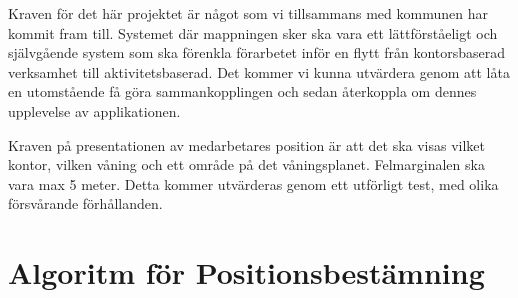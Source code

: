 \documentclass[swedish, a4paper,12pt]{article}
\begin{document}
%
%
%
%
%
Kraven för det här projektet är något som vi tillsammans med kommunen har kommit fram till. Systemet där mappningen sker ska vara ett lättförståeligt och självgående system som ska förenkla förarbetet inför en flytt från kontorsbaserad verksamhet till aktivitetsbaserad. Det kommer vi kunna utvärdera genom att låta en utomstående få göra sammankopplingen och sedan återkoppla om dennes upplevelse av applikationen.

Kraven på presentationen av medarbetares position är att det ska visas vilket kontor, vilken våning och ett område på det våningsplanet. Felmarginalen ska vara max 5 meter. Detta kommer utvärderas genom ett utförligt test, med olika försvårande förhållanden.

\section{Algoritm för Positionsbestämning}
\end{document}

